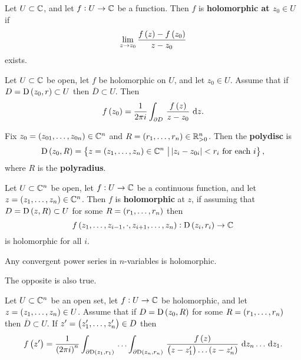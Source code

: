 \begin{definition}
Let $ U \subset \mathbb{C} $, and let $ f : U \to \mathbb{C} $ be a function. Then $ f $ is \textbf{holomorphic at $ z_0 \in U $} if
$$ \lim_{z \to z_0} \dfrac{f\br{z} - f\br{z_0}}{z - z_0} $$
exists.
\end{definition}

\begin{theorem}[Cauchy]
\label{thm:2.3}
Let $ U \subset \mathbb{C} $ be open, let $ f $ be holomorphic on $ U $, and let $ z_0 \in U $. Assume that if $ D = \D\br{z_0, r} \subset U $ then $ \overline{D} \subset U $. Then
$$ f\br{z_0} = \dfrac{1}{2\pi i}\intd{\partial D}{}{\dfrac{f\br{z}}{z - z_0}}{z}. $$
\end{theorem}

\begin{notation}
Fix $ z_0 = \br{z_{01}, \dots, z_{0n}} \in \CC^n $ and $ R = \br{r_1, \dots, r_n} \in \RR_{> 0}^n $. Then the \textbf{polydisc} is
$$ \D\br{z_0, R} = \cbr{z = \br{z_1, \dots, z_n} \in \CC^n \st \abs{z_i - z_{0i}} < r_i \ \text{for each} \ i}, $$
where $ R $ is the \textbf{polyradius}.
\end{notation}

\begin{definition}
Let $ U \subset \mathbb{C}^n $ be open, let $ f : U \to \mathbb{C} $ be a continuous function, and let $ z = \br{z_1, \dots, z_n} \in \CC^n $. Then $ f $ is \textbf{holomorphic} at $ z $, if assuming that $ D = \D\br{z, R} \subset U $ for some $ R = \br{r_1, \dots, r_n} $ then
$$ f\br{z_1, \dots, z_{i - 1}, \cdot, z_{i + 1}, \dots, z_n} : \D\br{z_i, r_i} \to \CC $$
is holomorphic for all $ i $.
\end{definition}

\begin{example}
Any convergent power series in $ n $-variables is holomorphic.
\end{example}

The opposite is also true.

\begin{theorem}[Cauchy]
\label{thm:2.7}
Let $ U \subset \mathbb{C}^n $ be an open set, let $ f : U \to \mathbb{C} $ be holomorphic, and let $ z = \br{z_1, \dots, z_n} \in U $. Assume that if $ D = \D\br{z_0, R} $ for some $ R = \br{r_1, \dots, r_n} $ then $ \overline{D} \subset U $. If $ z' = \br{z_1', \dots, z_n'} \in D $ then
$$ f\br{z'} = \dfrac{1}{\br{2\pi i}^n}\intd{\partial\D\br{z_1, r_1}}{}{\dots \intd{\partial\D\br{z_n, r_n}}{}{\dfrac{f\br{z}}{\br{z - z_1'} \dots \br{z - z_n'}}}{z_n \dots}}{z_1}. $$
\end{theorem}

